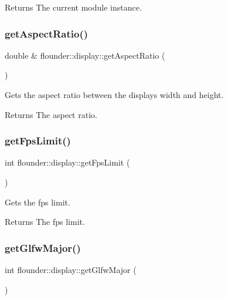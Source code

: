 \begin{DoxyReturn}{Returns}
The current module instance. 
\end{DoxyReturn}
\mbox{\label{classflounder_1_1display_a7b32aeb7809ad48663ce6eb4596b37a3}} 
\subsubsection{\texorpdfstring{get\+Aspect\+Ratio()}{getAspectRatio()}}
{\footnotesize\ttfamily double \& flounder\+::display\+::get\+Aspect\+Ratio (\begin{DoxyParamCaption}{ }\end{DoxyParamCaption})}



Gets the aspect ratio between the displays width and height. 

\begin{DoxyReturn}{Returns}
The aspect ratio. 
\end{DoxyReturn}
\mbox{\label{classflounder_1_1display_aea9d5368ecd65c53e634d1cec52f9718}} 
\subsubsection{\texorpdfstring{get\+Fps\+Limit()}{getFpsLimit()}}
{\footnotesize\ttfamily int flounder\+::display\+::get\+Fps\+Limit (\begin{DoxyParamCaption}{ }\end{DoxyParamCaption})}



Gets the fps limit. 

\begin{DoxyReturn}{Returns}
The fps limit. 
\end{DoxyReturn}
\mbox{\label{classflounder_1_1display_a5e6a9e9ea60e2f8d0850ea689abb0569}} 
\subsubsection{\texorpdfstring{get\+Glfw\+Major()}{getGlfwMajor()}}
{\footnotesize\ttfamily int flounder\+::display\+::get\+Glfw\+Major (\begin{DoxyParamCaption}{ }\end{DoxyParamCaption})\hspace{0.3cm}{\ttfamily [inline]}}



